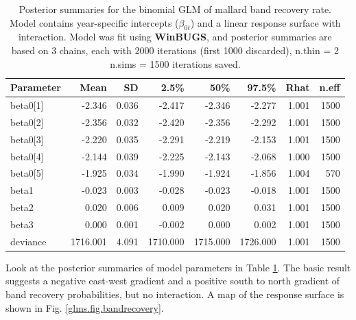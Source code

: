 \begin{table}
\caption{Posterior summaries for the binomial GLM of mallard band
  recovery rate.  Model contains year-specific intercepts
  ($\beta_{0t}$) and a linear response surface with interaction. 
Model was fit using {\bf WinBUGS}, and posterior summaries are based 
on 3 chains, each with 2000 iterations (first 1000 discarded), n.thin = 2
 n.sims = 1500 iterations saved.
   }
  \begin{tabular}{lrrrrrrr}
    \hline
        \hline
 Parameter &    Mean   & SD   &  2.5\%   &    50\%   &   97.5\% & Rhat & n.eff \\
     \hline
beta0[1] &  -2.346& 0.036&   -2.417&   -2.346&   -2.277& 1.001&  1500\\
beta0[2] &  -2.356& 0.032&   -2.420&   -2.356&   -2.292& 1.001&  1500\\
beta0[3] &  -2.220& 0.035&   -2.291&   -2.219&   -2.153& 1.001&  1500\\
beta0[4] &  -2.144& 0.039&   -2.225&   -2.143&   -2.068& 1.000&  1500\\
beta0[5] &  -1.925& 0.034&   -1.990&   -1.924&   -1.856& 1.004&   570\\
beta1    &  -0.023& 0.003&   -0.028&   -0.023&   -0.018& 1.001&  1500\\
beta2    &   0.020& 0.006&    0.009&    0.020&    0.031& 1.001&  1500\\
beta3    &   0.000& 0.001&   -0.002&    0.000&    0.002& 1.001&  1500\\
deviance &1716.001& 4.091& 1710.000&  1715.000&  1726.000& 1.001&  1500\\
    \hline
  \end{tabular}
  \label{glms.tab.mallard}
\vspace{0.5cm}
\end{table}



Look at the posterior summaries of model parameters in Table
\ref{glms.tab.mallard}. The basic result suggests a negative east-west
gradient and a positive south to north gradient of band recovery
probabilities, but no interaction. A map of the response surface is
shown in Fig. \ref{glms.fig.bandrecovery}.


